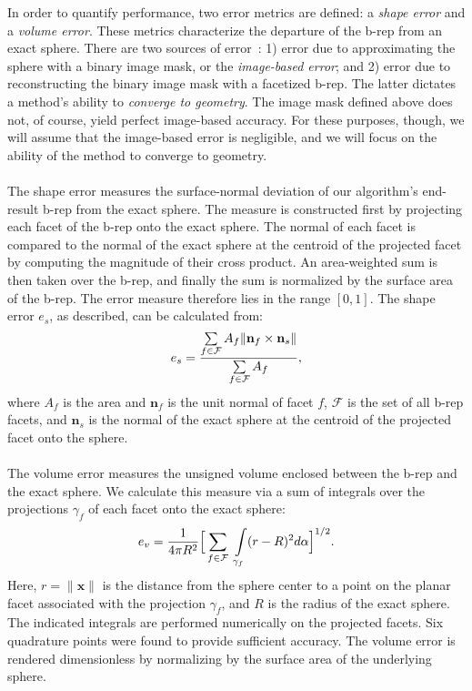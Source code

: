 In order to quantify performance, two error metrics are defined: a {\em shape error} and a {\em volume error}. These metrics characterize the departure of the b-rep from an exact sphere. There are two sources of error~\cite{young_2008}: 1) error due to approximating the sphere with a binary image mask, or the {\em image-based error}; and 2) error due to reconstructing the binary image mask with a facetized b-rep. The latter dictates a method's ability to {\em converge to geometry}. The image mask defined above does not, of course, yield perfect image-based accuracy. For these purposes, though, we will assume that the image-based error is negligible, and we will focus on the ability of the method to converge to geometry.\\ \\
%
The shape error measures the surface-normal deviation of our algorithm's end-result b-rep from the exact sphere. The measure is constructed first by projecting each facet of the b-rep onto the exact sphere. The normal of each facet is compared to the normal of the exact sphere at the centroid of the projected facet by computing the magnitude of their cross product. An area-weighted sum is then taken over the b-rep, and finally the sum is normalized by the surface area of the b-rep. The error measure therefore lies in the range $\left [0,1\right]$. The shape error $e_s$, as described, can be calculated from:
\begin{equation} 
	e_s = \frac{ \sum \limits_{f\in\mathcal{F}} A_f \lVert {\bf n}_f \times {\bf n}_s \rVert}{\sum \limits_{f\in\mathcal{F}} A_f},
\end{equation}
where $A_f$ is the area and ${\bm n}_f$ is the unit normal of facet $f$, $\mathcal{F}$ is the set of all b-rep facets, and ${\bm n}_s$ is the normal of the exact sphere at the centroid of the projected facet onto the sphere. \\ \\
%
The volume error measures the unsigned volume enclosed between the b-rep and the exact sphere. We calculate this measure via a sum of integrals over the projections $\gamma_f$ of each facet onto the exact sphere: 
\begin{equation}
\label{vol err}
	e_v = \frac{1}{4\pi R^2} \Big[\sum \limits_{f \in \mathcal{F}\textsl{}} \ \int \limits_{\gamma_f} (r - R)^2 d\alpha \Big]^{1/2} .
\end{equation}
Here, $r = \lVert {\bm x} \rVert$ is the distance from the sphere center to a point on the planar facet associated with the projection $\gamma_f$, and $R$ is the radius of the exact sphere.  The indicated integrals are performed numerically on the projected facets. Six quadrature points were found to provide sufficient accuracy. The volume error is rendered dimensionless by normalizing by the surface area of the underlying sphere.
